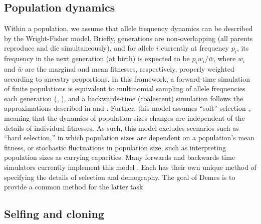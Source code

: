 \documentclass[11pt]{article}
\begin{document}
\subsection{Population dynamics}

Within a population, we assume that allele frequency dynamics can
be described by the Wright-Fisher model.
Briefly, generations are non-overlapping (all parents
reproduce and die simultaneously), and for allele $i$ currently at frequency $p_i$,
its frequency in the next generation (at birth) is expected to be $p_iw_i/\bar{w}$,
where $w_i$ and $\bar{w}$ are the marginal and
mean fitnesses, respectively, properly weighted according to ancestry proportions.
In this framework,
a forward-time simulation of finite populations is equivalent
to multinomial sampling of allele frequencies each
generation (\citet[][pp 29-31]{burger2000-ul}, \citet[][pp 179-181]{crowkimura1970}),
and a backwards-time (coalescent) simulation follows the approximations
described in \citet{tajima1983evolutionary,hudson1983testing}
and \citet[][chapter 3]{wakeley2008-hd}.
Further, this model assumes ``soft'' selection \citep{christiansen1975hard},
meaning that the dynamics of population sizes
changes are independent of the details of individual fitnesses.
As such, this model excludes scenarios such as ``hard selection,''
in which population sizes are dependent on a population's mean fitness, or
stochastic fluctuations in population size, such as interpreting
population sizes as carrying capacities.
Many forwards and backwards time simulators currently implement this model
\citep[e.g.,][]{hudson2002generating,gutenkunst2009inferring,excoffier2011fastsimcoal,kelleher2016efficient,jouganous2017inferring,haller2019slim,thornton2019-nu}.
Each has their own unique method of specifying the details of selection and demography.
The goal of Demes is to provide a common method for the latter task.

\subsection{Selfing and cloning}
\end{document}
